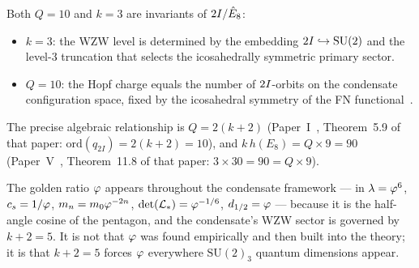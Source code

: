 \begin{proposition}[$Q=10$ and $k=3$ as McKay invariants]
\label{F:prop:mckay}
Both $Q=10$ and $k=3$ are invariants of $2I/\hat{E}_8$:
\begin{itemize}
  \item $k=3$: the WZW level is determined by the embedding
    $2I \hookrightarrow \mathrm{SU}(2)$ and the level-3 truncation
    that selects the icosahedrally symmetric primary sector.
  \item $Q=10$: the Hopf charge equals the number of $2I$-orbits
    on the condensate configuration space, fixed by the icosahedral
    symmetry of the FN functional~\cite{Paper1}.
\end{itemize}
The precise algebraic relationship is $Q = 2(k+2)$
(Paper~I~\cite{Paper1}, Theorem~5.9 of that paper: $\mathrm{ord}(q_{2I})=2(k+2)=10$),
and $k\,h(E_8) = Q\times 9 = 90$
(Paper~V~\cite{Paper5}, Theorem~11.8 of that paper: $3\times30=90=Q\times9$).
\end{proposition}

\begin{corollary}
\label{F:cor:phi_origin}
The golden ratio $\varphi$ appears throughout the condensate framework
--- in $\lambda=\varphi^6$, $c_s=1/\varphi$, $m_n=m_0\varphi^{-2n}$,
$\det(\mathcal{L}_*)=\varphi^{-1/6}$, $d_{1/2}=\varphi$ ---
because it is the half-angle cosine of the pentagon,
and the condensate's WZW sector is governed by $k+2=5$.
It is not that $\varphi$ was found empirically and then built into the theory;
it is that $k+2=5$ forces $\varphi$ everywhere $\mathrm{SU}(2)_3$
quantum dimensions appear.
\end{corollary}

